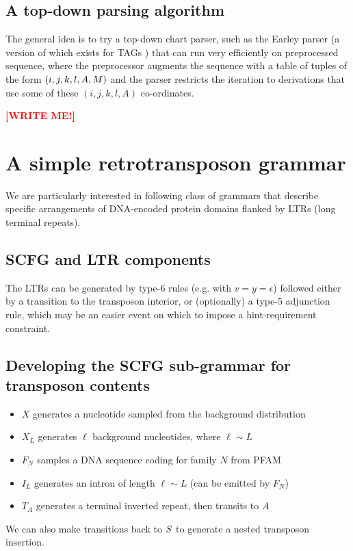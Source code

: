 \documentclass[10pt]{article}
\newcommand{\seclabel}[1]{\label{sec:#1}}
\newcommand\redpen[1]{{\bf \textcolor{red}{#1}} \textcolor{black}{}}
\newcommand\writeme{\redpen{\bf [WRITE ME!]}}
\begin{document}
\subsection{A top-down parsing algorithm}
\seclabel{TopDownParser}

The general idea is to try a top-down chart parser, such as the Earley parser \cite{Earley70}
(a version of which exists for TAGs \cite{kallmeyer2010parsing})
that can run very efficiently on preprocessed sequence,
where the preprocessor augments the sequence with a table of tuples of the form $(i,j,k,l,A,M)$
and the parser restricts the iteration to derivations that use some of these $(i,j,k,l,A)$ co-ordinates.

\writeme

\section{A simple retrotransposon grammar}
\seclabel{RetroGrammar}

We are particularly interested in following class of grammars that describe specific arrangements of DNA-encoded protein domains flanked by LTRs (long terminal repeats).

\subsection{SCFG and LTR components}

The LTRs can be generated by type-6 rules (e.g. with $v=y=\epsilon$) followed either by a transition to the transposon interior,
or (optionally) a type-5 adjunction rule, which may be an easier event on which to impose a hint-requirement constraint.

\subsection{Developing the SCFG sub-grammar for transposon contents}

\begin{itemize}
\item $X$ generates a nucleotide sampled from the background distribution
\item $X_L$ generates $\ell$ background nucleotides, where $\ell \sim L$
\item $F_N$ samples a DNA sequence coding for family $N$ from PFAM \cite{Pfam2008}
\item $I_L$ generates an intron of length $\ell \sim L$ (can be emitted by $F_N$)
\item $T_A$ generates a terminal inverted repeat, then transits to $A$
\end{itemize}
We can also make transitions back to $S$ to generate a nested transposon insertion.
\end{document}
